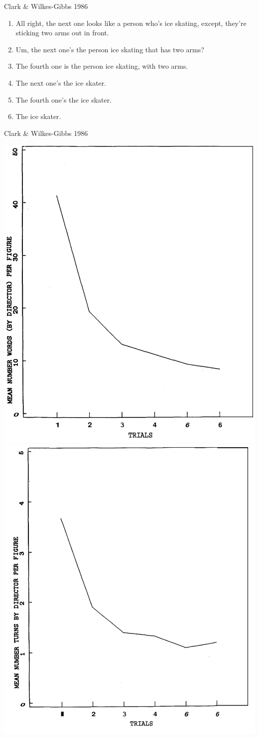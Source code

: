 \documentclass[ 12pt, xcolor=beamer,table,usenames,dvipsnames, ignorenonframetext, ngerman]{beamer}
\begin{document}
\begin{frame}{Clark \& Wilkes-Gibbs 1986}
\begin{small}
\begin{enumerate}
	\item All right, the next one looks like a person who's ice skating, except, they're sticking two arms out in front. \pause
	\item Um, the next one's the person ice skating that has two arms? \pause
	\item The fourth one is the person ice skating, with two arms. \pause
	\item The next one's the ice skater. \pause
	\item The fourth one's the ice skater. \pause
	\item The ice skater.
	\end{enumerate}
\end{small}
\end{frame}

\begin{frame}{Clark \& Wilkes-Gibbs 1986}
	
	\includegraphics[width=.48\textwidth]{../images/clark_words.png}
		\includegraphics[width=.5\textwidth]{../images/clark_turns.png}	
		
\end{frame}
\end{document}

